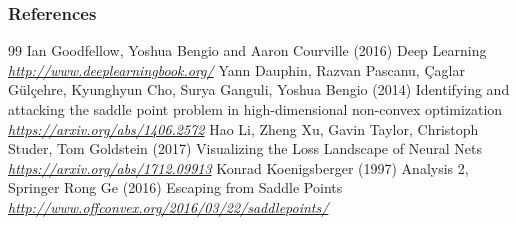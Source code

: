 \documentclass[11pt,compress,t,notes=noshow, xcolor=table]{beamer}
\begin{document}
\begin{vbframe}
\frametitle{References}
\footnotesize{
\begin{thebibliography}{99}
 Ian Goodfellow, Yoshua Bengio and Aaron Courville (2016)
\newblock Deep Learning
\newblock \emph{\url{http://www.deeplearningbook.org/}}
 Yann Dauphin, Razvan Pascanu, {\c{C}}aglar G{\"{u}}l{\c{c}}ehre, Kyunghyun Cho, Surya Ganguli, Yoshua Bengio (2014)
\newblock Identifying and attacking the saddle point problem in high-dimensional non-convex optimization
\newblock \emph{\url{https://arxiv.org/abs/1406.2572}}
 Hao Li, Zheng Xu, Gavin Taylor, Christoph Studer, Tom Goldstein (2017)
\newblock Visualizing the Loss Landscape of Neural Nets
\newblock \emph{\url{https://arxiv.org/abs/1712.09913}}
 Konrad Koenigsberger (1997)
\newblock Analysis 2, Springer
 Rong Ge (2016)
\newblock Escaping from Saddle Points
\newblock \emph{\url{http://www.offconvex.org/2016/03/22/saddlepoints/}}

\end{thebibliography}
}
\end{vbframe}

\endlecture
\end{document}
